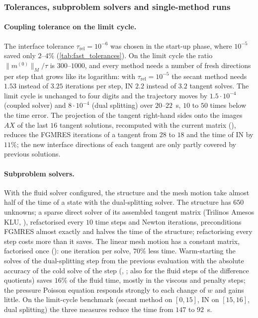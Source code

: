 \documentclass[11pt,a4paper]{article}
\theoremstyle{definition}
\theoremstyle{remark}
\newcommand{\M}{M}
\begin{document}
\subsubsection{Tolerances, subproblem solvers and single-method runs}\label{sec:fast_production}

\paragraph{Coupling tolerance on the limit cycle.} The interface tolerance
$\tau_{\mathrm{rel}}=10^{-6}$ was chosen in the start-up phase, where $10^{-5}$ saved only
$2$--$4\%$ (\cref{tab:fast_tolerances}). On the limit cycle the ratio $\|m^{(0)}\|_{\M}/\tau$ is
$300$--$1000$, and every method needs a number of fresh directions per step that grows like its
logarithm: with $\tau_{\mathrm{rel}}=10^{-5}$ the secant method needs $1.53$ instead of $3.25$
iterations per step, IN $2.2$ instead of $3.2$ tangent solves. The limit cycle is unchanged to four
digits and the trajectory moves by $1.5\cdot10^{-4}$ (coupled solver) and $8\cdot10^{-4}$ (dual
splitting) over $20$--$22$~s, $10$ to $50$ times below the time error. The projection of the
tangent right-hand sides onto the images $AX$ of the last $16$ tangent solutions, recomputed with the
current matrix (), reduces the FGMRES iterations of a tangent from $28$
to $18$ and the time of IN by $11\%$; the new interface directions of each tangent are only partly
covered by previous solutions.

\paragraph{Subproblem solvers.} With the fluid solver configured, the structure and the mesh
motion take almost half of the time of a state with the dual-splitting solver. The structure has $650$ unknowns; a sparse direct
solver of its assembled tangent matrix (Trilinos Amesos KLU, ), refactorised every $10$ time steps and Newton iterations, preconditions FGMRES almost
exactly and halves the time of the structure; refactorising every step costs more than it saves.
The linear mesh motion has a constant matrix, factorised once ():
one iteration per solve, $70\%$ less time. Warm-starting the solves of the dual-splitting step from
the previous evaluation with the absolute accuracy of the cold solve of the step (,
; also for the fluid steps of the difference quotients) saves
$16\%$ of the fluid time, mostly in the viscous and penalty steps; the pressure Poisson equation
responds strongly to each change of $w$ and gains little. On the limit-cycle benchmark (secant
method on $[0,15]$, IN on $[15,16]$, dual splitting) the three measures reduce the time from $147$
to $92$~s.
\end{document}
